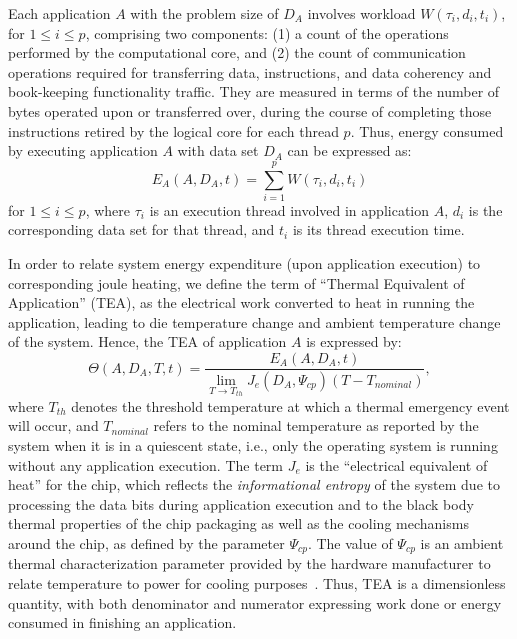 \documentclass[times, 10pt,twocolumn]{IEEEtran}
\begin{document}
Each application $A$ with the problem size of $D_{A}$ involves workload
$W(\tau_{i},d_{i},t_{i})$, for $1 \leq i \leq p$, comprising two
components: (1) a count of the operations performed by the computational
core, and (2) the count of communication operations required for
transferring data, instructions, and data coherency and book-keeping
functionality traffic.  They are measured in terms of the number of
bytes operated upon or transferred over, during the course of completing
those instructions retired by the logical core for each thread $p$.
Thus, energy consumed by executing application $A$ with data set $D_{A}$
can be expressed as:
\begin{equation}
\label{eq:eworkload} 
E_{A}(A,D_{A},t) = \displaystyle \sum_{i=1}^{p}W(\tau_{i},d_{i},t_{i})
\end{equation}
for $1\leq i \leq p$, where $\tau_{i}$ is an execution thread involved in
application $A$, $d_{i}$ is the corresponding data set for that thread,
and $t_{i}$ is its thread execution time.

In order to relate system energy expenditure (upon application
execution) to corresponding joule heating, we define the term of
``Thermal Equivalent of Application'' (TEA), as the electrical work
converted to heat in running the application, leading to die temperature
change and ambient temperature change of the system.  Hence, the TEA of
application $A$ is expressed by:
\begin{equation}
\label{eq:tea} \Theta(A, D_{A}, T, t) =
\frac{E_{A}(A, D_{A}, t)}{\displaystyle \lim_{T \to T_{th}} J_e(D_{A}, \Psi_{cp}) (T -T_{nominal})},
\end{equation} 
where $T_{th}$ denotes the threshold temperature at which a thermal
emergency event will occur, and $T_{nominal}$ refers to the nominal
temperature as reported by the system when it is in a quiescent state,
i.e., only the operating system is running without any application
execution.  The term $J_{e}$ is the ``electrical equivalent of heat''
for the chip, which reflects the \textit{informational
  entropy} of the system due to processing the data bits
during application execution and to the black body thermal properties of
the chip packaging as well as the cooling mechanisms around the chip, as
defined by the parameter $\Psi_{cp}$.  The value of $\Psi_{cp}$ is an
ambient thermal characterization parameter provided by the hardware
manufacturer to relate temperature to power for cooling
purposes~\cite{Intel2006}.  Thus, TEA is a dimensionless quantity, with
both denominator and numerator expressing work done or energy consumed
in finishing an application.
\end{document}
